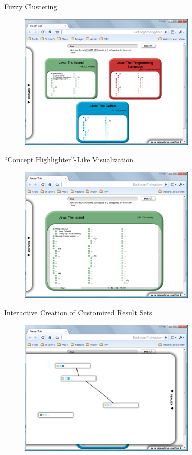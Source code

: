 \documentclass{beamer}
\begin{document}
\begin{frame}{Fuzzy Clustering}
	\begin{figure}[htbp]
		\begin{center}
			\includegraphics[height=65mm]{images/approach_fuzzy-clustering.png}
		\end{center}
	\end{figure}
\end{frame}

\begin{frame}{``Concept Highlighter''-Like Visualization}
	\begin{figure}[htbp]
		\begin{center}
			\includegraphics[height=65mm]{images/approach_resultlist.png}
		\end{center}
	\end{figure}
\end{frame}

\begin{frame}{Interactive Creation of Customized Result Sets}
	\begin{figure}[htbp]
		\begin{center}
			\includegraphics[height=65mm]{images/approach_interactive-creation-of-customized-result-sets.png}
		\end{center}
	\end{figure}
\end{frame}
\end{document}
